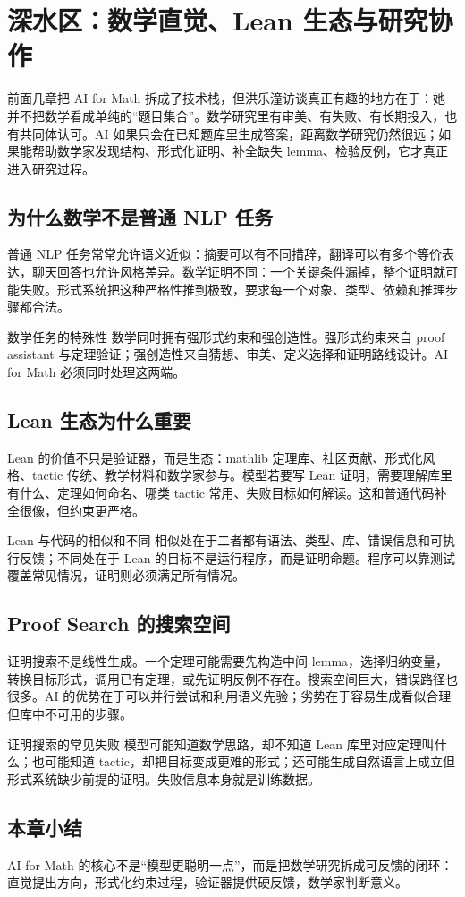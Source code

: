 \section{深水区：数学直觉、Lean 生态与研究协作}

前面几章把 AI for Math 拆成了技术栈，但洪乐潼访谈真正有趣的地方在于：她并不把数学看成单纯的“题目集合”。数学研究里有审美、有失败、有长期投入，也有共同体认可。AI 如果只会在已知题库里生成答案，距离数学研究仍然很远；如果能帮助数学家发现结构、形式化证明、补全缺失 lemma、检验反例，它才真正进入研究过程。

\subsection{为什么数学不是普通 NLP 任务}

普通 NLP 任务常常允许语义近似：摘要可以有不同措辞，翻译可以有多个等价表达，聊天回答也允许风格差异。数学证明不同：一个关键条件漏掉，整个证明就可能失败。形式系统把这种严格性推到极致，要求每一个对象、类型、依赖和推理步骤都合法。

\begin{importantbox}{数学任务的特殊性}
数学同时拥有强形式约束和强创造性。强形式约束来自 proof assistant 与定理验证；强创造性来自猜想、审美、定义选择和证明路线设计。AI for Math 必须同时处理这两端。
\end{importantbox}

\subsection{Lean 生态为什么重要}

Lean 的价值不只是验证器，而是生态：mathlib 定理库、社区贡献、形式化风格、tactic 传统、教学材料和数学家参与。模型若要写 Lean 证明，需要理解库里有什么、定理如何命名、哪类 tactic 常用、失败目标如何解读。这和普通代码补全很像，但约束更严格。

\begin{knowledgebox}{Lean 与代码的相似和不同}
相似处在于二者都有语法、类型、库、错误信息和可执行反馈；不同处在于 Lean 的目标不是运行程序，而是证明命题。程序可以靠测试覆盖常见情况，证明则必须满足所有情况。
\end{knowledgebox}

\subsection{Proof Search 的搜索空间}

证明搜索不是线性生成。一个定理可能需要先构造中间 lemma，选择归纳变量，转换目标形式，调用已有定理，或先证明反例不存在。搜索空间巨大，错误路径也很多。AI 的优势在于可以并行尝试和利用语义先验；劣势在于容易生成看似合理但库中不可用的步骤。

\begin{warningbox}{证明搜索的常见失败}
模型可能知道数学思路，却不知道 Lean 库里对应定理叫什么；也可能知道 tactic，却把目标变成更难的形式；还可能生成自然语言上成立但形式系统缺少前提的证明。失败信息本身就是训练数据。
\end{warningbox}

\subsection{本章小结}

AI for Math 的核心不是“模型更聪明一点”，而是把数学研究拆成可反馈的闭环：直觉提出方向，形式化约束过程，验证器提供硬反馈，数学家判断意义。

